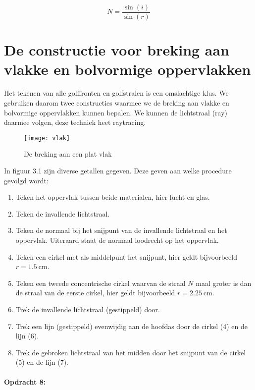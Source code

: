 \[
N=\frac{\sin(i)}{\sin(r)}
\]



\section{De constructie voor breking aan vlakke en bolvormige oppervlakken}

Het tekenen van alle golffronten en golfstralen is een omslachtige
klus. We gebruiken daarom twee constructies waarmee we de breking
aan vlakke en bolvormige oppervlakken kunnen bepalen. We kunnen de
lichtstraal (ray) daarmee volgen, deze techniek heet raytracing.

\begin{figure}[H]
\noindent \begin{centering}
\texttt{[image: vlak]}
\par\end{centering}

\caption{De breking aan een plat vlak}
\end{figure}


In figuur 3.1 zijn diverse getallen gegeven. Deze geven aan welke
procedure gevolgd wordt:
\begin{enumerate}
\item Teken het oppervlak tussen beide materialen, hier lucht en glas.
\item Teken de invallende lichtstraal.
\item Teken de normaal bij het snijpunt van de invallende lichtstraal en
het oppervlak. Uiteraard staat de normaal loodrecht op het oppervlak.
\item Teken een cirkel met als middelpunt het snijpunt, hier geldt bijvoorbeeld
$r=\SI{1.5}{\centi\meter}$.
\item Teken een tweede concentrische cirkel waarvan de straal $N$ maal
groter is dan de straal van de eerste cirkel, hier geldt bijvoorbeeld
$r=\SI{2.25}{\centi\meter}$. 
\item Trek de invallende lichtstraal (gestippeld) door. 
\item Trek een lijn (gestippeld) evenwijdig aan de hoofdas door de cirkel
(4) en de lijn (6).
\item Trek de gebroken lichtstraal van het midden door het snijpunt van
de cirkel (5) en de lijn (7).
\end{enumerate}

\paragraph*{Opdracht 8:}


